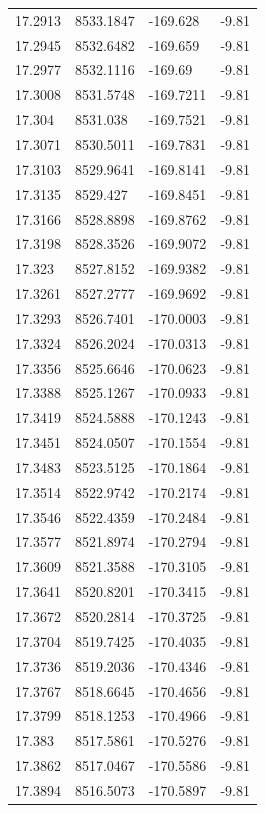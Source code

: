 \begin{table}[H]
\begin{tabular}{llll}
17.2913 & 8533.1847 & -169.628 & -9.81 \\
17.2945 & 8532.6482 & -169.659 & -9.81 \\
17.2977 & 8532.1116 & -169.69 & -9.81 \\
17.3008 & 8531.5748 & -169.7211 & -9.81 \\
17.304 & 8531.038 & -169.7521 & -9.81 \\
17.3071 & 8530.5011 & -169.7831 & -9.81 \\
17.3103 & 8529.9641 & -169.8141 & -9.81 \\
17.3135 & 8529.427 & -169.8451 & -9.81 \\
17.3166 & 8528.8898 & -169.8762 & -9.81 \\
17.3198 & 8528.3526 & -169.9072 & -9.81 \\
17.323 & 8527.8152 & -169.9382 & -9.81 \\
17.3261 & 8527.2777 & -169.9692 & -9.81 \\
17.3293 & 8526.7401 & -170.0003 & -9.81 \\
17.3324 & 8526.2024 & -170.0313 & -9.81 \\
17.3356 & 8525.6646 & -170.0623 & -9.81 \\
17.3388 & 8525.1267 & -170.0933 & -9.81 \\
17.3419 & 8524.5888 & -170.1243 & -9.81 \\
17.3451 & 8524.0507 & -170.1554 & -9.81 \\
17.3483 & 8523.5125 & -170.1864 & -9.81 \\
17.3514 & 8522.9742 & -170.2174 & -9.81 \\
17.3546 & 8522.4359 & -170.2484 & -9.81 \\
17.3577 & 8521.8974 & -170.2794 & -9.81 \\
17.3609 & 8521.3588 & -170.3105 & -9.81 \\
17.3641 & 8520.8201 & -170.3415 & -9.81 \\
17.3672 & 8520.2814 & -170.3725 & -9.81 \\
17.3704 & 8519.7425 & -170.4035 & -9.81 \\
17.3736 & 8519.2036 & -170.4346 & -9.81 \\
17.3767 & 8518.6645 & -170.4656 & -9.81 \\
17.3799 & 8518.1253 & -170.4966 & -9.81 \\
17.383 & 8517.5861 & -170.5276 & -9.81 \\
17.3862 & 8517.0467 & -170.5586 & -9.81 \\
17.3894 & 8516.5073 & -170.5897 & -9.81 \\

\end{tabular}
\end{table}
